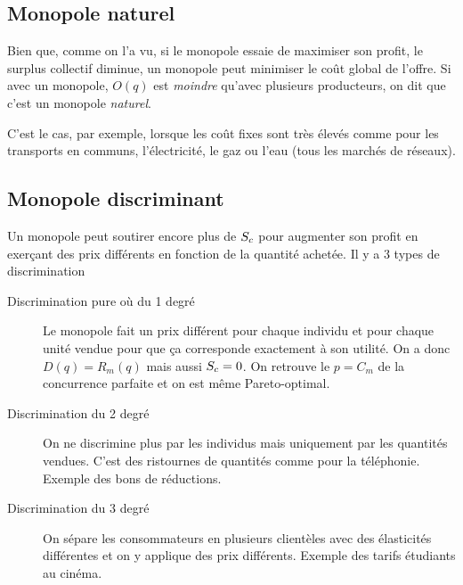  
\subsection{Monopole naturel}
Bien que, comme on l'a vu, si le monopole essaie de maximiser
son profit, le surplus collectif diminue,
un monopole peut minimiser le coût global de l'offre.
Si avec un monopole, $O(q)$ est \emph{moindre} qu'avec plusieurs producteurs,
on dit que c'est un monopole \emph{naturel}.

C'est le cas, par exemple, lorsque les coût fixes sont très élevés comme
pour les transports en communs, l'électricité, le gaz ou l'eau
(tous les marchés de réseaux).

\subsection{Monopole discriminant}
Un monopole peut soutirer encore plus de ${S_c}$ pour augmenter
son profit en exerçant des prix différents en fonction de la quantité
achetée.
Il y a 3 types de discrimination
\begin{description}
  \item[Discrimination pure où du 1\ier{} degré]
    Le monopole fait un prix différent pour chaque individu et pour chaque
    unité vendue pour que ça corresponde exactement à son utilité.
    On a donc $D(q) = R_m(q)$ mais aussi ${S_c} = 0$.
    On retrouve le $p = C_m$ de la concurrence parfaite et on est même
    Pareto-optimal.
  \item[Discrimination du 2\ieme{} degré]
    On ne discrimine plus par les individus mais uniquement par les quantités
    vendues.
    C'est des ristournes de quantités comme pour la téléphonie.
    Exemple des bons de réductions. 
  \item[Discrimination du 3\ieme{} degré]
    On sépare les consommateurs en plusieurs clientèles avec des élasticités
    différentes et on y applique des prix différents.
    Exemple des tarifs étudiants au cinéma.
\end{description}

